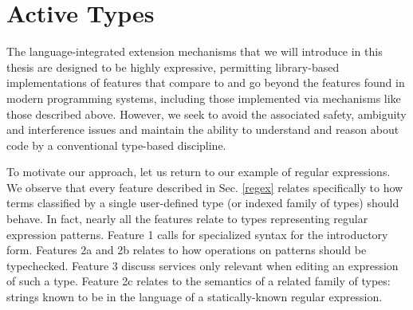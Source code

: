 \section{Active Types}\label{contributions}
The language-integrated extension mechanisms that we will introduce in this thesis are designed to be highly {expressive}, permitting library-based implementations of features that compare to and go beyond the features found in modern programming systems, including those implemented via mechanisms like those described above. However, we seek to avoid the associated {safety}, ambiguity and interference issues and  maintain the ability to understand and reason about code by a conventional type-based discipline. %

To motivate our approach, let us return to our example of regular expressions. We observe that every feature described in Sec. \ref{regex} relates specifically to how terms  classified by a single user-defined type (or indexed family of types) should behave. In fact, nearly all the features relate to types representing regular expression patterns. Feature 1 calls for specialized syntax for the introductory form. Features 2a and 2b relates to how operations on patterns should be typechecked. Feature 3 discuss services only relevant when editing an expression of such a type. Feature 2c relates to the semantics of a related  family of types: strings known to be in the language of a statically-known regular expression. %

